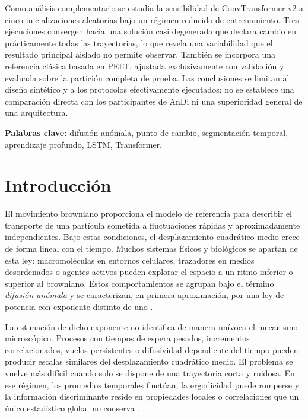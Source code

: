 \documentclass[a4paper,12pt]{article}
\begin{document}
Como análisis complementario se estudia la sensibilidad de ConvTransformer-v2 a cinco inicializaciones aleatorias bajo un régimen reducido de entrenamiento. Tres ejecuciones convergen hacia una solución casi degenerada que declara cambio en prácticamente todas las trayectorias, lo que revela una variabilidad que el resultado principal aislado no permite observar. También se incorpora una referencia clásica basada en PELT, ajustada exclusivamente con validación y evaluada sobre la partición completa de prueba. Las conclusiones se limitan al diseño sintético y a los protocolos efectivamente ejecutados; no se establece una comparación directa con los participantes de AnDi ni una superioridad general de una arquitectura.

\noindent\textbf{Palabras clave:} difusión anómala, punto de cambio, segmentación temporal, aprendizaje profundo, LSTM, Transformer.

\clearpage
\tableofcontents
\clearpage

\section{Introducción}

El movimiento browniano proporciona el modelo de referencia para describir el transporte de una partícula sometida a fluctuaciones rápidas y aproximadamente independientes. Bajo estas condiciones, el desplazamiento cuadrático medio crece de forma lineal con el tiempo. Muchos sistemas físicos y biológicos se apartan de esta ley: macromoléculas en entornos celulares, trazadores en medios desordenados o agentes activos pueden explorar el espacio a un ritmo inferior o superior al browniano. Estos comportamientos se agrupan bajo el término \emph{difusión anómala} y se caracterizan, en primera aproximación, por una ley de potencia con exponente distinto de uno \cite{metzler2000random,metzler2014anomalous}.

La estimación de dicho exponente no identifica de manera unívoca el mecanismo microscópico. Procesos con tiempos de espera pesados, incrementos correlacionados, vuelos persistentes o difusividad dependiente del tiempo pueden producir escalas similares del desplazamiento cuadrático medio. El problema se vuelve más difícil cuando solo se dispone de una trayectoria corta y ruidosa. En ese régimen, los promedios temporales fluctúan, la ergodicidad puede romperse y la información discriminante reside en propiedades locales o correlaciones que un único estadístico global no conserva \cite{metzler2014anomalous,manzo2015review}.
\end{document}

